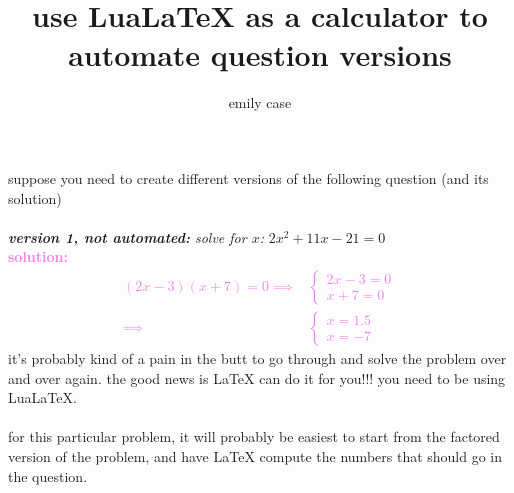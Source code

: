 \documentclass{article}
\title{use LuaLaTeX as a calculator to automate question versions}
\author{emily case}
\date{}
\newcommand\mycalc[1]{%
    \luaexec{ tex.sprint ( string.format( "\%g" , #1 ) )}
}%
\begin{document}
\maketitle
suppose you need to create different versions of the following question (and its solution)
\\\\
\emph{\textbf{version 1, not automated:} solve for $x$:} $ 2x^2 + 11x - 21 = 0 $\\
    \textcolor{violet}{
    \textbf{solution:}
    \begin{align*}
        (2x-3)(x+7) = 0 
        \implies & \begin{cases}
            2x - 3 = 0 \\
            x+7 = 0 
        \end{cases} \\
        \implies & \begin{cases}
            x = 1.5 \\
            x = -7
        \end{cases}
    \end{align*}}
it's probably kind of a pain in the butt to go through and solve the problem over and over again. the good news is LaTeX can do it for you!!! you need to be using LuaLaTeX.
\\\\
for this particular problem, it will probably be easiest to start from the factored version of the problem, and have LaTeX compute the numbers that should go in the question. \\

\newcommand{\aval}{2}
\newcommand{\bval}{3}
\newcommand{\cval}{7}


\newcommand{\xone}{\mycalc{(\bval / \aval)}}     %

\newcommand{\coeffone}{\mycalc{\aval * 1}}
\newcommand{\coefftwo}{\mycalc{\aval*\cval - 1*\bval}}
\newcommand{\coeffthree}{\mycalc{\bval*\cval}}
\end{document}
